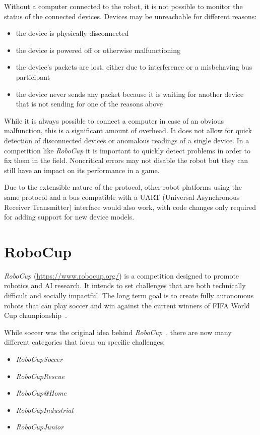 Without a computer connected to the robot, it is not possible to monitor the status of the connected
devices. Devices may be unreachable for different reasons:

\begin{itemize}
    \item the device is physically disconnected
    \item the device is powered off or otherwise malfunctioning
    \item the device's packets are lost, either due to interference or a misbehaving bus participant
    \item the device never sends any packet because it is waiting for another device that is not sending
          for one of the reasons above
\end{itemize}

While it is always possible to connect a computer in case of an obvious malfunction, this is a
significant amount of overhead. It does not allow for quick detection of disconnected devices
or anomalous readings of a single device. In a competition like \textit{RoboCup} it is important
to quickly detect problems in order to fix them in the field. Noncritical errors may not disable
the robot but they can still have an impact on its performance in a game.

Due to the extensible nature of the protocol, other robot platforms using the same protocol and
a bus compatible with a UART (Universal Asynchronous Receiver Transmitter) interface would also
work, with code changes only required for adding support for new device models.

\section{RoboCup}
\label{introduction/robocup}

\textit{RoboCup} (\url{https://www.robocup.org/}) is a competition designed to promote robotics and
AI research. It intends to set challenges that are both technically difficult and socially impactful.
The long term goal is to create fully autonomous robots that can play soccer and win against the
current winners of FIFA World Cup championship~\cite{robocup-objective}.

While soccer was the original idea behind \textit{RoboCup}~\cite{robocup-history}, there are now many
different categories that focus on specific challenges:

\begin{itemize}
    \item \textit{RoboCupSoccer}
    \item \textit{RoboCupRescue}
    \item \textit{RoboCup@Home}
    \item \textit{RoboCupIndustrial}
    \item \textit{RoboCupJunior}
\end{itemize}

